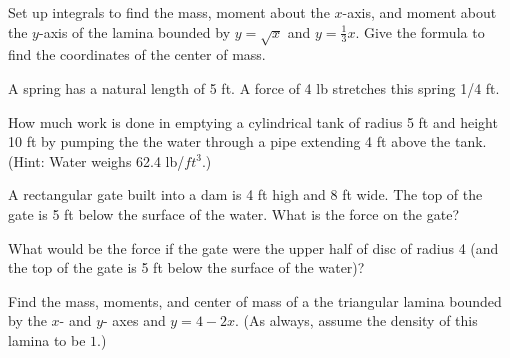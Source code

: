 \documentclass[12pt]{exam}
\begin{document}
\begin{questions}
\question Set up integrals to find the mass, moment about the $x$-axis, and
moment about the $y$-axis of the lamina bounded by $y=\sqrt{x}$ and
$y=\displaystyle \frac{1}{3} x$.  
Give the formula to find the coordinates of the center of mass.
\vspace{2.3in}

\question A spring has a natural length of 5 ft.  A force of
4 lb stretches this spring 1/4 ft.  
\vspace{1.3in}

\question How much work is done in emptying a cylindrical tank of 
radius 5 ft and height 10 ft by pumping the the water through a 
pipe extending 4 ft above the tank.  (Hint: Water weighs 62.4 lb/$ft^3$.)
\vspace{2.3in}

\question A rectangular gate built into a dam is 4 ft high and 8 ft wide.
The top of the gate is 5 ft below the surface of the water.  What is the 
force on the gate?
\vspace{2.3in}

\question What would be  the force if the gate were the upper half of disc of
radius 4 (and the top of the gate is 5 ft below the surface of the water)?
\vspace{2.3in}

\question Find the mass, moments, and center of mass of a the
triangular lamina bounded by the $x$- and $y$- axes and $y=4-2x$.
(As always, assume the density of this lamina to be $1$.)










\end{questions}
\end{document}
